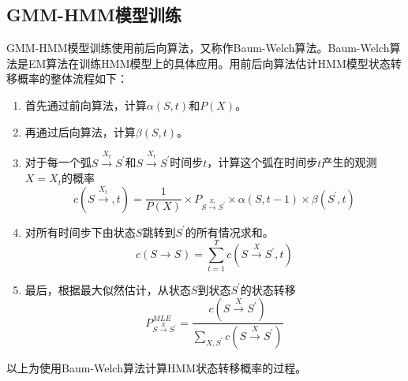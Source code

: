 \subsection{GMM-HMM模型训练}
GMM-HMM模型训练使用前后向算法，又称作Baum-Welch算法。Baum-Welch算法是EM算法在训练HMM模型上的具体应用。用前后向算法估计HMM模型状态转移概率的整体流程如下：
\begin{enumerate}
  \item 首先通过前向算法，计算$\alpha(S,t)$和$P(X)$。
  \item 再通过后向算法，计算$\beta(S,t)$。
  \item 对于每一个弧$S\xrightarrow{X_t}S^{'}$和$S \xrightarrow{X_t} S^{'}$时间步$t$，计算这个弧在时间步$t$产生的观测$X=X_t$的概率\begin{equation}c(S\xrightarrow {X_t},t)=\frac{1}{P(X)}\times P_{S\xrightarrow {X_t}S^{'}} \times \alpha(S,t-1) \times \beta(S^{'},t)\end{equation}
  \item 对所有时间步下由状态$S$跳转到$S^{'}$的所有情况求和。\begin{equation}c(S\rightarrow S^{})=\sum_{t=1}^T c(S\xrightarrow X S^{'},t)\end{equation}
  \item 最后，根据最大似然估计，从状态$S$到状态$S^{'}$的状态转移\begin{equation}P_{S\xrightarrow X S^{'}}^{MLE} =\frac{c(S\xrightarrow X S^{'})}{\sum_{X,S^{'}} c(S\xrightarrow X S^{'})}\end{equation}
\end{enumerate}
以上为使用Baum-Welch算法计算HMM状态转移概率的过程。

